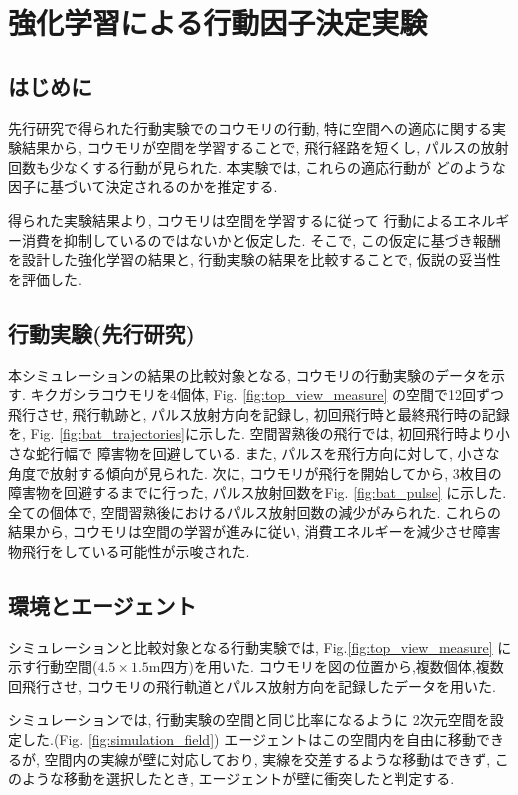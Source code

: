 \documentclass[../main]{subfiles}
\begin{document}
\newpage
\chapter{強化学習による行動因子決定実験}
\label{chap:simulation}

\section{はじめに}
先行研究で得られた行動実験でのコウモリの行動, 
特に空間への適応に関する実験結果から, 
コウモリが空間を学習することで, 飛行経路を短くし, 
パルスの放射回数も少なくする行動が見られた.
本実験では, これらの適応行動が
どのような因子に基づいて決定されるのかを推定する.

得られた実験結果より,
コウモリは空間を学習するに従って
行動によるエネルギー消費を抑制しているのではないかと仮定した.
そこで, この仮定に基づき報酬を設計した強化学習の結果と, 
行動実験の結果を比較することで, 仮説の妥当性を評価した.


\section{行動実験(先行研究\cite{ref:mibesan})}
本シミュレーションの結果の比較対象となる, 
コウモリの行動実験のデータを示す.
キクガシラコウモリを4個体, Fig. \ref{fig:top_view_measure}
の空間で12回ずつ飛行させ, 
飛行軌跡と, パルス放射方向を記録し, 
初回飛行時と最終飛行時の記録を, 
Fig. \ref{fig:bat_trajectories}に示した.
空間習熟後の飛行では, 初回飛行時より小さな蛇行幅で
障害物を回避している. 
また, パルスを飛行方向に対して, 
小さな角度で放射する傾向が見られた.
次に, コウモリが飛行を開始してから, 
3枚目の障害物を回避するまでに行った, 
パルス放射回数をFig. \ref{fig:bat_pulse}
に示した.
全ての個体で, 空間習熟後におけるパルス放射回数の減少がみられた.
これらの結果から, コウモリは空間の学習が進みに従い, 
消費エネルギーを減少させ障害物飛行をしている可能性が示唆された.


\section{環境とエージェント}
シミュレーションと比較対象となる行動実験では,
Fig.\ref{fig:top_view_measure}
に示す行動空間($4.5 \times 1.5$\si{m}四方)を用いた.
コウモリを図の位置から,複数個体,複数回飛行させ,
コウモリの飛行軌道とパルス放射方向を記録したデータを用いた.

シミュレーションでは, 行動実験の空間と同じ比率になるように
2次元空間を設定した.(Fig. \ref{fig:simulation_field})
エージェントはこの空間内を自由に移動できるが,
空間内の実線が壁に対応しており,
実線を交差するような移動はできず, 
このような移動を選択したとき, 
エージェントが壁に衝突したと判定する.
\end{document}
